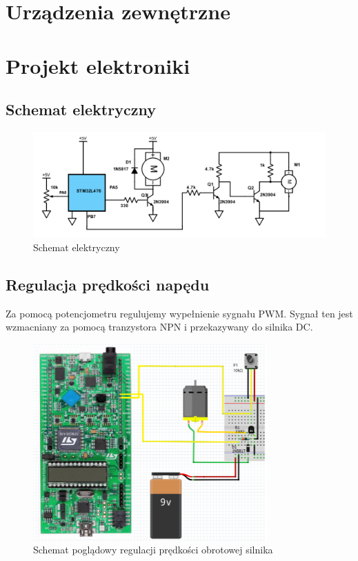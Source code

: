 \documentclass[10pt, a4paper]{article}
\begin{document}
\section{Urządzenia zewnętrzne}


\section{Projekt elektroniki}
	\subsection{Schemat elektryczny}
	\begin{figure}[H]
		\centering
		\includegraphics[width=1\textwidth]{figures/schemeit-project.png}
		\caption{Schemat elektryczny}
		\label{fig:Schemat elektryczny}
	\end{figure}
	
\subsection{Regulacja prędkości napędu}
Za pomocą potencjometru regulujemy wypełnienie sygnału PWM. Sygnał ten jest wzmacniany za pomocą tranzystora NPN i przekazywany do silnika DC.

\begin{figure}[H]
	\centering
	\includegraphics[width=0.8\textwidth]{figures/pwm.png}
	\caption{Schemat poglądowy regulacji prędkości obrotowej silnika}
	\label{fig:KonfiguracjaPWM}
\end{figure}
\end{document}
